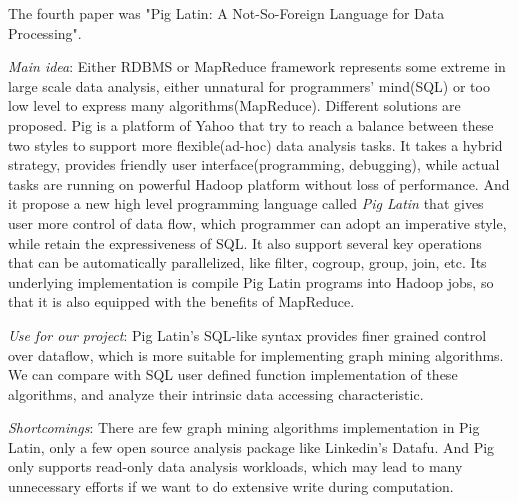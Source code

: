 The fourth paper was "Pig Latin: A Not-So-Foreign Language for Data Processing".
\cite{olston2008pig}
\begin{itemize*}
\item {\em Main idea}: 
    Either RDBMS or MapReduce framework represents some extreme in large scale data analysis, either unnatural for programmers' mind(SQL) or too low level to express many algorithms(MapReduce). Different solutions are proposed. Pig is a platform of Yahoo that try to reach a balance between these two styles to support more flexible(ad-hoc) data analysis tasks. It takes a hybrid strategy, provides friendly user interface(programming, debugging), while actual tasks are running on powerful Hadoop platform without loss of performance. And it propose a new high level programming language called \emph{Pig Latin} that gives user more control of data flow, which programmer can adopt an imperative style, while retain the expressiveness of SQL. It also support several key operations that can be automatically parallelized, like filter, cogroup, group, join, etc. Its underlying implementation is compile Pig Latin programs into Hadoop jobs, so that it is also equipped with the benefits of MapReduce. 
\item {\em Use for our project}:
    Pig Latin's SQL-like syntax provides finer grained control over dataflow, which is more suitable for implementing graph mining algorithms. We can compare with SQL user defined function implementation of these algorithms, and analyze their intrinsic data accessing characteristic.
\item {\em Shortcomings}:
    There are few graph mining algorithms implementation in Pig Latin, only a few open source analysis package like Linkedin's Datafu. And Pig only supports read-only data analysis workloads, which may lead to many unnecessary efforts if we want to do extensive write during computation.
\end{itemize*}

